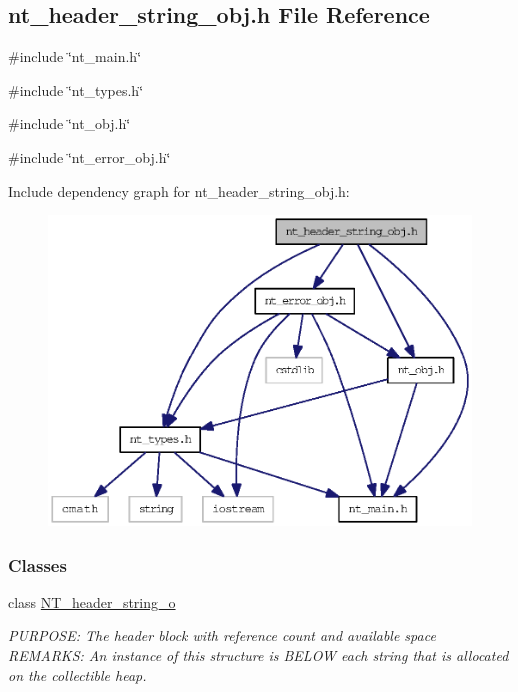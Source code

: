 \subsection{nt\_\-header\_\-string\_\-obj.h File Reference}
\label{nt__header__string__obj_8h}
{\ttfamily \#include \char`\"{}nt\_\-main.h\char`\"{}}\par
{\ttfamily \#include \char`\"{}nt\_\-types.h\char`\"{}}\par
{\ttfamily \#include \char`\"{}nt\_\-obj.h\char`\"{}}\par
{\ttfamily \#include \char`\"{}nt\_\-error\_\-obj.h\char`\"{}}\par
Include dependency graph for nt\_\-header\_\-string\_\-obj.h:
\nopagebreak
\begin{figure}[H]
\begin{center}
\leavevmode
\includegraphics[width=392pt]{nt__header__string__obj_8h__incl}
\end{center}
\end{figure}
\subsubsection*{Classes}
\begin{DoxyCompactItemize}
\item 
class \hyperlink{class_n_t__header__string__o}{NT\_\-header\_\-string\_\-o}
\begin{DoxyCompactList}\small\item\em PURPOSE: The header block with reference count and available space REMARKS: An instance of this structure is BELOW each string that is allocated on the collectible heap. \item\end{DoxyCompactList}\end{DoxyCompactItemize}
